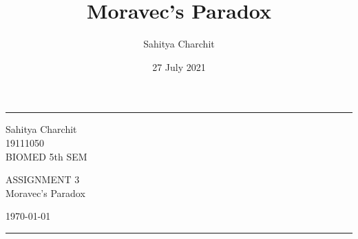 \documentclass{article}
\title{Moravec's Paradox}
\author{Sahitya Charchit }
\date{27 July 2021}
\begin{document}
    
    \fancyhead{}
    \hrule \medskip %
    \begin{minipage}{0.295\textwidth} 
    \raggedright
    \footnotesize
    Sahitya Charchit\hfill\\   
    19111050\hfill\\
    BIOMED 5th SEM
    \end{minipage}
    \begin{minipage}{0.4\textwidth} 
    \centering 
    \normalsize
    ASSIGNMENT 3\\
    \Large 
    Moravec's Paradox\\ 
    \end{minipage}
    \begin{minipage}{0.295\textwidth} 
    \raggedleft
    \today\hfill\\
    \end{minipage}
    \medskip\hrule 
    \bigskip
\end{document}
